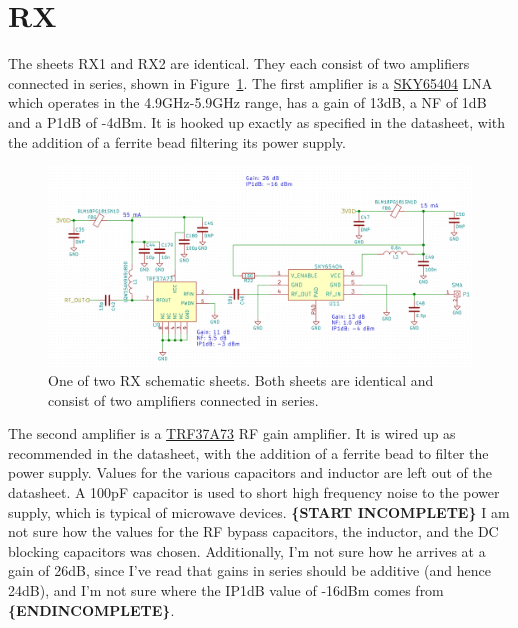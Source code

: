 \section{RX}
\label{sec:rx}

The sheets RX1 and RX2 are identical. They each consist of two amplifiers connected in series, shown
in Figure~\ref{fig:rx-sch}. The first amplifier is a
\href{http://www.skyworksinc.com/uploads/documents/SKY65404_31_201512J.pdf}{SKY65404} LNA which
operates in the 4.9GHz-5.9GHz range, has a gain of 13dB, a NF of 1dB and a P1dB of -4dBm. It is
hooked up exactly as specified in the datasheet, with the addition of a ferrite bead filtering its
power supply.

\begin{figure}[h]
  \centering
  \includegraphics[width=\textwidth]{data/rx-sch.png}
  \caption{One of two RX schematic sheets. Both sheets are identical and consist of two amplifiers
    connected in series.}
  \label{fig:rx-sch}
\end{figure}

The second amplifier is a \href{http://www.ti.com/lit/ds/symlink/trf37a73.pdf}{TRF37A73} RF gain
amplifier. It is wired up as recommended in the datasheet, with the addition of a ferrite bead to
filter the power supply. Values for the various capacitors and inductor are left out of the
datasheet. A 100pF capacitor is used to short high frequency noise to the power supply, which is
typical of microwave devices. \textbf{\{START INCOMPLETE\}} I am not sure how the values for the RF
bypass capacitors, the inductor, and the DC blocking capacitors was chosen. Additionally, I'm not
sure how he arrives at a gain of 26dB, since I've read that gains in series should be additive (and
hence 24dB), and I'm not sure where the IP1dB value of -16dBm comes from \textbf{\{ENDINCOMPLETE\}}.

